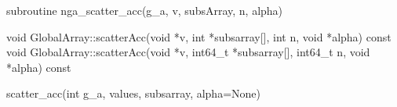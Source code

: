 \documentclass[12pt]{article}
\begin{document}
\begin{fapi}
\begin{fcode}
subroutine nga_scatter_acc(g_a, v, subsArray, n, alpha)
\end{fcode}
\begin{funcargs}
\end{funcargs}
\end{fapi}

\begin{cxxapi}
\begin{cxxcode}
void GlobalArray::scatterAcc(void *v, int *subsarray[], int n, void *alpha) const
void GlobalArray::scatterAcc(void *v, int64_t *subsarray[], int64_t n, void *alpha) const
\end{cxxcode}
\begin{funcargs}
\end{funcargs}
\end{cxxapi}

\begin{pyapi}
\begin{pycode}
scatter_acc(int g_a, values, subsarray, alpha=None) 
\end{pycode}
\end{pyapi}

\ncoll
\end{document}
